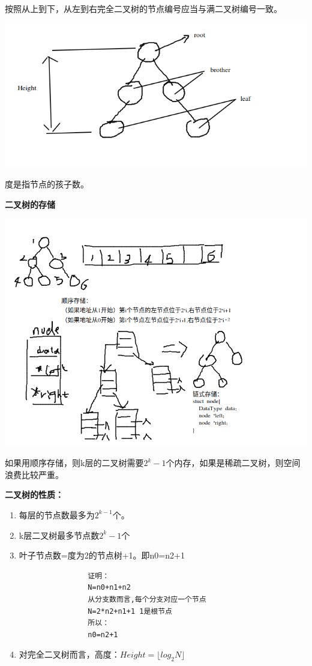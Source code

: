 \documentclass{article}
\begin{document}
	按照从上到下，从左到右完全二叉树的节点编号应当与满二叉树编号一致。

	\includegraphics[scale=0.4]{./pic/tree-02-1.png}

	度是指节点的孩子数。

	\textbf{二叉树的存储}

	\includegraphics[scale=0.4]{./pic/tree-03.png}

	如果用顺序存储，则k层的二叉树需要$2^{k}-1$个内存，如果是稀疏二叉树，则空间浪费比较严重。

	\textbf{二叉树的性质：}
	\begin{enumerate}
		\item 每层的节点数最多为$2^{k-1}$个。
		\item k层二叉树最多节点数$2^{k}-1$个
		\item 叶子节点数=度为2的节点树+1。即n0=n2+1
			\begin{verbatim}
				证明：
				N=n0+n1+n2
				从分支数而言,每个分支对应一个节点
				N=2*n2+n1+1 1是根节点
				所以：
				n0=n2+1
			\end{verbatim}
		\item 对完全二叉树而言，高度：$Height=\lfloor log_2N \rfloor $
	\end{enumerate}
\end{document}
